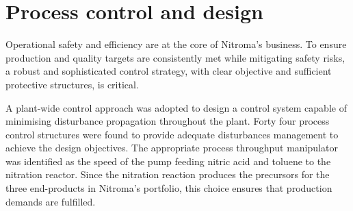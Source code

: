 \section*{Process control and design}

Operational safety and efficiency are at the core of Nitroma's business. To ensure production and quality targets are consistently met while mitigating safety risks, a robust and sophisticated control strategy, with clear objective and sufficient protective structures, is critical.

A plant-wide control approach was adopted to design a control system capable of minimising disturbance propagation throughout the plant. Forty four process control structures were found to provide adequate disturbances management to achieve the design objectives.  The appropriate process throughput manipulator was identified as the speed of the pump feeding nitric acid and toluene to the nitration reactor. Since the nitration reaction produces the precursors for the three end-products in Nitroma's portfolio, this choice ensures that production demands are fulfilled.    







